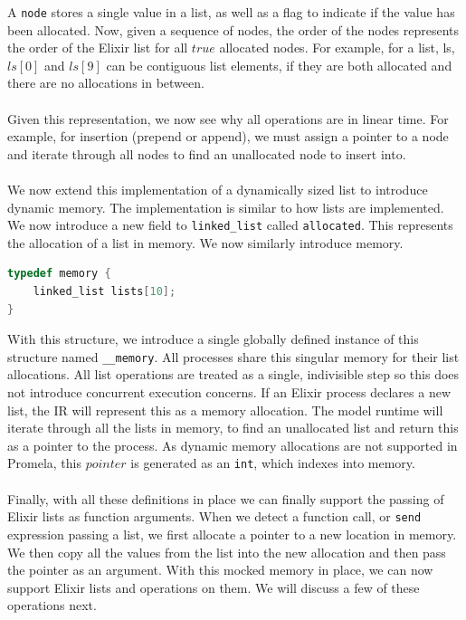 A \texttt{node} stores a single value in a list, as well as a flag to indicate if the value has been allocated. Now, given a sequence of nodes, the order of the nodes represents the order of the Elixir list for all $true$ allocated nodes. For example, for a list, ls, $ls[0]$ and $ls[9]$ can be contiguous list elements, if they are both allocated and there are no allocations in between.
\\ \\
Given this representation, we now see why all operations are in linear time. For example, for insertion (prepend or append), we must assign a pointer to a node and iterate through all nodes to find an unallocated node to insert into.
\\ \\
We now extend this implementation of a dynamically sized list to introduce dynamic memory. The implementation is similar to how lists are implemented. We now introduce a new field to \texttt{linked\_list} called \texttt{allocated}. This represents the allocation of a list in memory. We now similarly introduce memory.
\begin{lstlisting}[language=C, xleftmargin=.1\linewidth, caption={Memory intermediate representation.}]
typedef memory {
    linked_list lists[10];
}
\end{lstlisting}
With this structure, we introduce a single globally defined instance of this structure named \texttt{\_\_memory}. All processes share this singular memory for their list allocations. All list operations are treated as a single, indivisible step so this does not introduce concurrent execution concerns. If an Elixir process declares a new list, the IR will represent this as a memory allocation. The model runtime will iterate through all the lists in memory, to find an unallocated list and return this as a pointer to the process. As dynamic memory allocations are not supported in Promela, this $pointer$ is generated as an \texttt{int}, which indexes into memory. 
\\ \\
Finally, with all these definitions in place we can finally support the passing of Elixir lists as function arguments. When we detect a function call, or \texttt{send} expression passing a list, we first allocate a pointer to a new location in memory. We then copy all the values from the list into the new allocation and then pass the pointer as an argument. With this mocked memory in place, we can now support Elixir lists and operations on them. We will discuss a few of these operations next.
\\ \\
